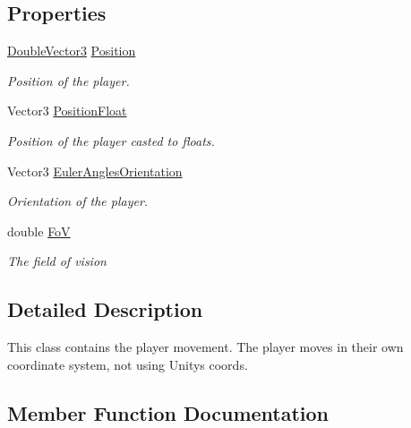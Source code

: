 \subsection*{Properties}
\begin{DoxyCompactItemize}
\item 
\mbox{\hyperlink{class_double_vector3}{Double\+Vector3}} \mbox{\hyperlink{class_player_movement_ab91c0a1effeb227350b5f20fb4fa3635}{Position}}
\begin{DoxyCompactList}\small\item\em Position of the player. \end{DoxyCompactList}\item 
Vector3 \mbox{\hyperlink{class_player_movement_aff90fe02ac21c9e00aa3e429e02b24e2}{Position\+Float}}
\begin{DoxyCompactList}\small\item\em Position of the player casted to floats. \end{DoxyCompactList}\item 
Vector3 \mbox{\hyperlink{class_player_movement_ad6d9510889cdc5425dfe09bf03636517}{Euler\+Angles\+Orientation}}
\begin{DoxyCompactList}\small\item\em Orientation of the player. \end{DoxyCompactList}\item 
double \mbox{\hyperlink{class_player_movement_a37d3be37d31d77c38902c467cd081df2}{FoV}}
\begin{DoxyCompactList}\small\item\em The field of vision \end{DoxyCompactList}\end{DoxyCompactItemize}


\subsection{Detailed Description}
This class contains the player movement. The player moves in their own coordinate system, not using Unity\textquotesingle{}s coords. 



\subsection{Member Function Documentation}
\mbox{\label{class_player_movement_afe10130e4f22b8ebda23ea6b452ad5b2}} 
